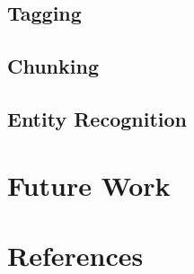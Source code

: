 \documentclass{acm_proc_article-sp}
\begin{document}
\subsection{Tagging}
\subsection{Chunking}
\subsection{Entity Recognition}
\section{Future Work}
\section{References}
\end{document}

